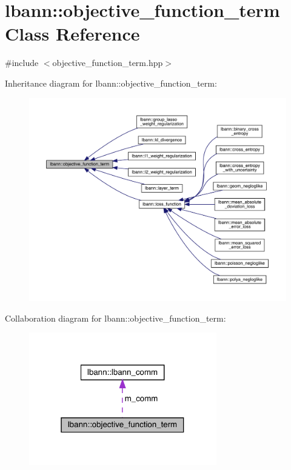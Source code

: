 \hypertarget{classlbann_1_1objective__function__term}{}\section{lbann\+:\+:objective\+\_\+function\+\_\+term Class Reference}
\label{classlbann_1_1objective__function__term}


{\ttfamily \#include $<$objective\+\_\+function\+\_\+term.\+hpp$>$}



Inheritance diagram for lbann\+:\+:objective\+\_\+function\+\_\+term\+:\nopagebreak
\begin{figure}[H]
\begin{center}
\leavevmode
\includegraphics[width=350pt]{classlbann_1_1objective__function__term__inherit__graph}
\end{center}
\end{figure}


Collaboration diagram for lbann\+:\+:objective\+\_\+function\+\_\+term\+:\nopagebreak
\begin{figure}[H]
\begin{center}
\leavevmode
\includegraphics[width=232pt]{classlbann_1_1objective__function__term__coll__graph}
\end{center}
\end{figure}
